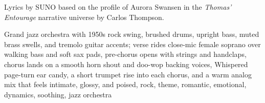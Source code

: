 
\begin{notes}
Lyrics by SUNO based on the profile of Aurora Swansen in the \emph{Thomas’ Entourage} narrative universe by Carlos Thompson.
\end{notes}
\begin{style}
Grand jazz orchestra with 1950s rock swing, brushed drums, upright bass, muted brass swells, and tremolo guitar accents; verse rides close-mic female soprano over walking bass and soft sax pads, pre-chorus opens with strings and handclaps, chorus lands on a smooth horn shout and doo-wop backing voices, Whispered page-turn ear candy, a short trumpet rise into each chorus, and a warm analog mix that feels intimate, glossy, and poised, rock, theme, romantic, emotional, dynamics, soothing, jazz orchestra
\end{style}
